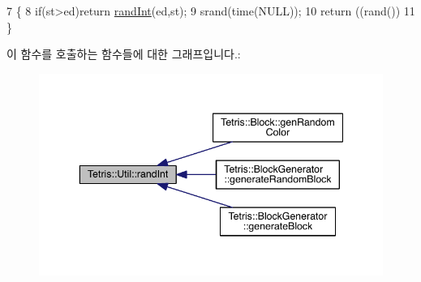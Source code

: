 \begin{DoxyCode}
7                                    \{
8             \textcolor{keywordflow}{if}(st>ed)\textcolor{keywordflow}{return} \hyperlink{namespace_tetris_1_1_util_aa590e9fd847ac6e0c9bc6bf464b5a74b}{randInt}(ed,st);
9             srand(time(NULL));
10             \textcolor{keywordflow}{return} ((rand())%
11         \}
\end{DoxyCode}
이 함수를 호출하는 함수들에 대한 그래프입니다.\+:
\nopagebreak
\begin{figure}[H]
\begin{center}
\leavevmode
\includegraphics[width=344pt]{dd/d6b/namespace_tetris_1_1_util_aa590e9fd847ac6e0c9bc6bf464b5a74b_icgraph}
\end{center}
\end{figure}
